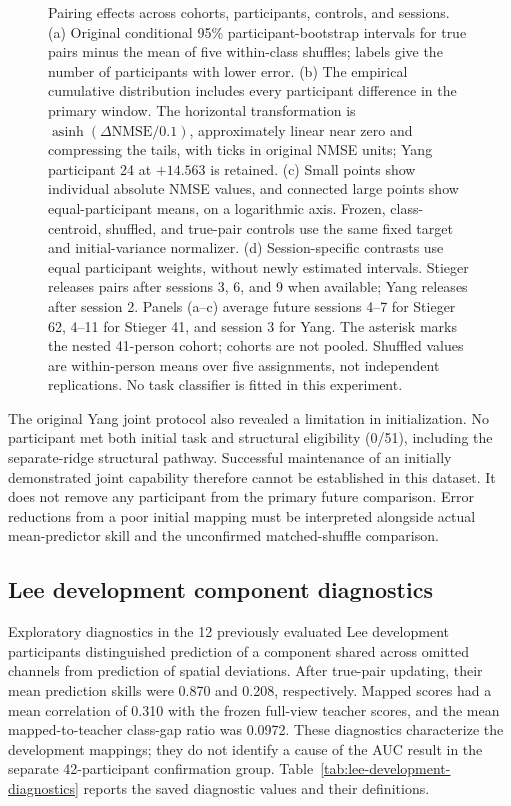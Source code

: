 \documentclass[11pt,a4paper]{article}
\begin{document}
\begin{figure}[t]
{\begin{tikzpicture}
\end{tikzpicture}%
}
\caption{Pairing effects across cohorts, participants, controls, and sessions. (a) Original conditional 95\% participant-bootstrap intervals for true pairs minus the mean of five within-class shuffles; labels give the number of participants with lower error. (b) The empirical cumulative distribution includes every participant difference in the primary window. The horizontal transformation is $\operatorname{asinh}(\Delta\mathrm{NMSE}/0.1)$, approximately linear near zero and compressing the tails, with ticks in original NMSE units; Yang participant 24 at $+14.563$ is retained. (c) Small points show individual absolute NMSE values, and connected large points show equal-participant means, on a logarithmic axis. Frozen, class-centroid, shuffled, and true-pair controls use the same fixed target and initial-variance normalizer. (d) Session-specific contrasts use equal participant weights, without newly estimated intervals. Stieger releases pairs after sessions 3, 6, and 9 when available; Yang releases after session 2. Panels (a--c) average future sessions 4--7 for Stieger 62, 4--11 for Stieger 41, and session 3 for Yang. The asterisk marks the nested 41-person cohort; cohorts are not pooled. Shuffled values are within-person means over five assignments, not independent replications. No task classifier is fitted in this experiment.}
\label{fig:eeg-pairing-forest}
\end{figure}

The original Yang joint protocol also revealed a limitation in initialization. No participant met both initial task and structural eligibility (0/51), including the separate-ridge structural pathway. Successful maintenance of an initially demonstrated joint capability therefore cannot be established in this dataset. It does not remove any participant from the primary future comparison. Error reductions from a poor initial mapping must be interpreted alongside actual mean-predictor skill and the unconfirmed matched-shuffle comparison.





\subsection{Lee development component diagnostics}
\label{sec:lee-diagnostics}

Exploratory diagnostics in the 12 previously evaluated Lee development participants distinguished prediction of a component shared across omitted channels from prediction of spatial deviations. After true-pair updating, their mean prediction skills were 0.870 and 0.208, respectively. Mapped scores had a mean correlation of 0.310 with the frozen full-view teacher scores, and the mean mapped-to-teacher class-gap ratio was 0.0972. These diagnostics characterize the development mappings; they do not identify a cause of the AUC result in the separate 42-participant confirmation group. Table~\ref{tab:lee-development-diagnostics} reports the saved diagnostic values and their definitions.
\end{document}
